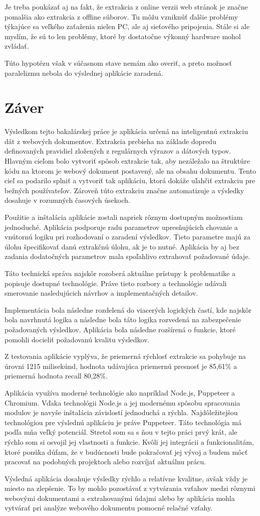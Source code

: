 Je treba poukázať aj na fakt, že extrakcia z online verzii web stránok je značne pomalšia ako extrakcia z offline súborov. Tu môžu vzniknúť ďalšie problémy týkajúce sa veľkého zaťaženia nielen PC, ale aj sieťového pripojenia. Stále si ale myslím, že sú to len problémy, ktoré by dostatočne výkonný hardware mohol zvládať.

Túto hypotézu však v súčasnom stave nemám ako overiť, a preto možnosť paralelizmu nebola do výslednej aplikácie zaradená.


\chapter{Záver}

Výsledkom tejto bakalárskej práce je aplikácia určená na inteligentnú extrakciu dát z webových dokumentov. Extrakcia prebieha na základe dopredu definovaných pravidiel zložených z regulárnych výrazov a dátových typov. Hlavným cieľom bolo vytvoriť spôsob extrakcie tak, aby nezáležalo na štruktúre kódu na ktorom je webový dokument postavený, ale na obsahu dokumentu. Tento cieľ sa podarilo splniť a vytvoriť tak aplikáciu, ktorá dokáže uľahčiť extrakciu pre bežných používateľov. Zároveň túto extrakciu značne automatizuje a výsledky dosahuje v rozumných časových úsekoch.

Použitie a inštalácia aplikácie zostali napriek rôznym dostupným možnostiam jednoduché. Aplikácia podporuje radu parametrov upresňujúcich chovanie a vnútornú logiku pri rozhodovaní o zaradení výsledkov. Tieto parametre majú za úlohu špecifikovať danú extrakčnú úlohu, ak je to nutné. Aplikácia by aj bez zadania dodatočných parametrov mala spoľahlivo extrahovať požadované údaje.

Táto technická správa najskôr rozoberá aktuálne prístupy k problematike a popisuje dostupné technológie. Práve tieto rozbory a technológie udávali smerovanie nasledujúcich návrhov a implementačných detailov. 

Implementácia bola následne rozdelená do viacerých logických častí, kde najskôr bola navrhnutá logika a následne bola táto logika rozvedená na zabezpečenie požadovaných výsledkov. Aplikácia bola následne rozšírená o funkcie, ktoré pomohli docieliť požadovanú kvalitu výsledkov.

Z testovania aplikácie vyplýva, že priemerná rýchlosť extrakcie sa pohybuje na úrovni 1215 milisekúnd, hodnota udávajúca priemernú presnosť je 85,61\% a priemerná hodnota recall 80,28\%. 

Aplikácia využíva moderné technológie ako napríklad Node.js, Puppeteer a Chromium. Vďaka technológii Node.js a jej modernému spôsobu spracovania modulov je navyše inštalácia závislostí jednoduchá a rýchla. Najdôležitejšou technológiou pre výslednú aplikáciu je práve Puppeteer. Táto technológia má podľa mňa veľký potenciál. Stretol som sa s ňou v tejto práci prvý krát, ale rýchlo som si osvojil jej vlastnosti a funkcie. Kvôli jej integrácii a funkcionalitám, ktoré ponúka dúfam, že v budúcnosti bude pokračovať jej vývoj a budem môcť pracovať na podobných projektoch alebo rozvíjať aktuálnu prácu.

Výsledná aplikácia dosahuje výsledky rýchlo a relatívne kvalitne, avšak vždy je miesto na zlepšenie. To by mohlo pozostávať z vytvárania vzťahov medzi rôznymi webovými dokumentami a extrahovanými údajmi alebo by aplikácia mohla vytvárať pri analýze webového dokumentu pomocné relačné vzťahy.
